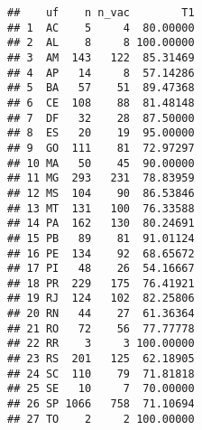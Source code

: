\documentclass[
]{article}
\begin{document}
\begin{verbatim}
##    uf    n n_vac        T1
## 1  AC    5     4  80.00000
## 2  AL    8     8 100.00000
## 3  AM  143   122  85.31469
## 4  AP   14     8  57.14286
## 5  BA   57    51  89.47368
## 6  CE  108    88  81.48148
## 7  DF   32    28  87.50000
## 8  ES   20    19  95.00000
## 9  GO  111    81  72.97297
## 10 MA   50    45  90.00000
## 11 MG  293   231  78.83959
## 12 MS  104    90  86.53846
## 13 MT  131   100  76.33588
## 14 PA  162   130  80.24691
## 15 PB   89    81  91.01124
## 16 PE  134    92  68.65672
## 17 PI   48    26  54.16667
## 18 PR  229   175  76.41921
## 19 RJ  124   102  82.25806
## 20 RN   44    27  61.36364
## 21 RO   72    56  77.77778
## 22 RR    3     3 100.00000
## 23 RS  201   125  62.18905
## 24 SC  110    79  71.81818
## 25 SE   10     7  70.00000
## 26 SP 1066   758  71.10694
## 27 TO    2     2 100.00000
\end{verbatim}
\end{document}
